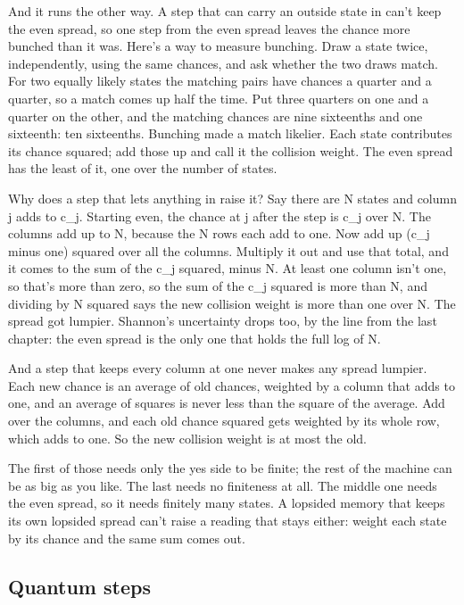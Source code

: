 \documentclass[11pt,twoside]{article}
\theoremstyle{thielethm}
\theoremstyle{thieledef}
\theoremstyle{thieledef}
\theoremstyle{thieledef}
\theoremstyle{thielethm}
\theoremstyle{thieleobs}
\theoremstyle{thielethm}
\begin{document}
And it runs the other way. A step that can carry an outside state in can't keep the even spread, so one step from the even spread leaves the chance more bunched than it was. Here's a way to measure bunching. Draw a state twice, independently, using the same chances, and ask whether the two draws match. For two equally likely states the matching pairs have chances a quarter and a quarter, so a match comes up half the time. Put three quarters on one and a quarter on the other, and the matching chances are nine sixteenths and one sixteenth: ten sixteenths. Bunching made a match likelier. Each state contributes its chance squared; add those up and call it the collision weight. The even spread has the least of it, one over the number of states.

Why does a step that lets anything in raise it? Say there are N states and column j adds to c\_j. Starting even, the chance at j after the step is c\_j over N. The columns add up to N, because the N rows each add to one. Now add up (c\_j minus one) squared over all the columns. Multiply it out and use that total, and it comes to the sum of the c\_j squared, minus N. At least one column isn't one, so that's more than zero, so the sum of the c\_j squared is more than N, and dividing by N squared says the new collision weight is more than one over N. The spread got lumpier. Shannon's uncertainty drops too, by the line from the last chapter: the even spread is the only one that holds the full log of N.

And a step that keeps every column at one never makes any spread lumpier. Each new chance is an average of old chances, weighted by a column that adds to one, and an average of squares is never less than the square of the average. Add over the columns, and each old chance squared gets weighted by its whole row, which adds to one. So the new collision weight is at most the old.

The first of those needs only the yes side to be finite; the rest of the machine can be as big as you like. The last needs no finiteness at all. The middle one needs the even spread, so it needs finitely many states. A lopsided memory that keeps its own lopsided spread can't raise a reading that stays either: weight each state by its chance and the same sum comes out.

\subsection{Quantum steps}
\end{document}

